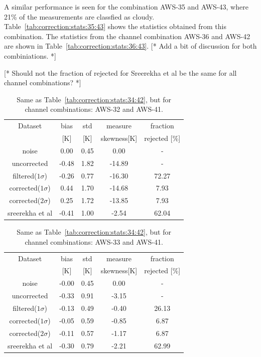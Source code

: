 \documentclass[12pt]{article}
\begin{document}
A similar performance is seen for the combination AWS-35 and AWS-43, where 21\%
of the measurements are classfied as cloudy.
Table~\ref{tab:correction:stats:35:43} shows the statistics obtained from this
combination. The statistics from the channel combination AWS-36 and AWS-42 are
shown in Table~\ref{tab:correction:stats:36:43}. [* Add a bit of discussion for
both combiniations. *]

[* Should not the fraction of rejected for Sreerekha et al be the same for all
channel combinations? *]

\begin{table}[!bt]
	\centering
	\begin{tabular}[b]{c|c|c|c|c}
		Dataset  		  &   bias &   std &   measure & fraction \\
							&   [K]  &   [K] & skewness[K] & rejected [\%]\\
		\hline
noise             		&   0.00 &  0.45 &               0.00 &                - \\
uncorrected       		&  -0.48 &  1.82 &             -14.89 &                - \\
filtered($1\sigma$)  	&  -0.26 &  0.77 &             -16.30 &               72.27 \\
corrected($1\sigma$) 	&   0.44 &  1.70 &             -14.68 &                7.93 \\
corrected($2\sigma$) 	&   0.25 &  1.72 &             -13.85 &                7.93 \\
sreerekha et al   		&  -0.41 &  1.00 &              -2.54 &               62.04 \\
		\hline
	\end{tabular}
	\caption{Same as Table~\ref{tab:correction:stats:34:42}, but for channel combinations: AWS-32 and AWS-41.   }
	\label{tab:correction:stats:32:41}
\end{table}

\begin{table}[!bt]
	\centering
	\begin{tabular}[b]{c|c|c|c|c}
		Dataset  		  &   bias &   std &   measure  & fraction\\
						&   [K]  &   [K] & skewness[K]  & rejected [\%]\\
		\hline
	noise       	    	&  -0.00 &  0.45 &               0.00 &               - \\
	uncorrected	    		&  -0.33 &  0.91 &              -3.15 &                - \\
	filtered($1\sigma$)  	&  -0.13 &  0.49 &              -0.40 &               26.13 \\
	corrected($1\sigma$) 	&  -0.05 &  0.59 &              -0.85 &                6.87 \\
	corrected($2\sigma$) 	&  -0.11 &  0.57 &              -1.17 &                6.87 \\
	sreerekha et al   		&  -0.30 &  0.79 &              -2.21 &               62.99 \\

		\hline
	\end{tabular}
	\caption{Same as Table~\ref{tab:correction:stats:34:42}, but for channel combinations: AWS-33 and AWS-41.   }
	\label{tab:correction:stats:33:41}
\end{table}
\end{document}
